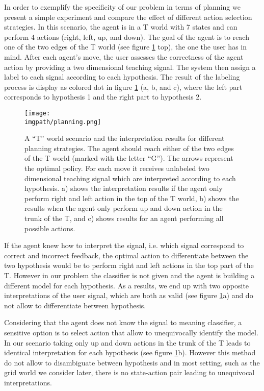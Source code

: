 In order to exemplify the specificity of our problem in terms of planning we present a simple experiment and compare the effect of different action selection strategies. In this scenario, the agent is in a T world with 7 states and can perform 4 actions (right, left, up, and down). The goal of the agent is to reach one of the two edges of the T world (see figure \ref{fig:planningExplained} top), the one the user has in mind. After each agent's move, the user assesses the correctness of the agent action by providing a two dimensional teaching signal. The system then assign a label to each signal according to each hypothesis. The result of the labeling process is display as colored dot in figure \ref{fig:planningExplained} (a, b, and c), where the left part corresponds to hypothesis 1 and the right part to hypothesis 2.

\begin{figure}[!ht]
  \centering
      \texttt{[image: \\imgpath/planning.png]}
      \caption{A ``T'' world scenario and the interpretation results for different planning strategies. The agent should reach either of the two edges of the T world (marked with the letter ``G''). The arrows represent the optimal policy. For each move it receives unlabeled two dimensional teaching signal which are interpreted according to each hypothesis. a) shows the interpretation results if the agent only perform right and left action in the top of the T world, b) shows the results when the agent only perform up and down action in the trunk of the T, and c) shows results for an agent performing all possible actions.}
    \label{fig:planningExplained}
\end{figure}

If the agent knew how to interpret the signal, i.e. which signal correspond to correct and incorrect feedback, the optimal action to differentiate between the two hypothesis would be to perform right and left actions in the top part of the T. However in our problem the classifier is not given and the agent is building a different model for each hypothesis. As a results, we end up with two opposite interpretations of the user signal, which are both as valid (see figure \ref{fig:planningExplained}a) and do not allow to differentiate between hypothesis.

Considering that the agent does not know the signal to meaning classifier, a sensitive option is to select action that allow to unequivocally identify the model. In our scenario taking only up and down actions in the trunk of the T leads to identical interpretation for each hypothesis (see figure \ref{fig:planningExplained}b). However this method do not allow to disambiguate between hypothesis and in most setting, such as the grid world we consider later, there is no state-action pair leading to unequivocal interpretations.

